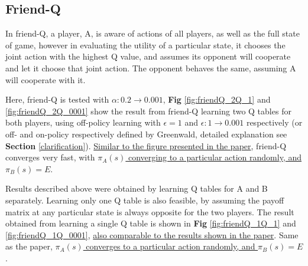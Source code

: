 \documentclass[10pt]{article}
\begin{document}



\subsection{Friend-Q} \label{friendQ}
In friend-Q\cite{LittmanFriendorFoeQlearningGeneralSum2001, GreenwaldCorrelatedQLearning2003, GreenwaldCorrelatedQLearning2005}, a player, A, is aware of actions of all players, as well as the full state of game, however in evaluating the utility of a particular state, it chooses the joint action with the highest Q value, and assumes its opponent will cooperate and let it choose that joint action. The opponent behaves the same, assuming A will cooperate with it.\par

Here, friend-Q is tested with $\alpha:0.2\rightarrow0.001$, \textbf{Fig} \ref{fig:friendQ_2Q_1} and \ref{fig:friendQ_2Q_0001} show the result from friend-Q learning two Q tables for both players, using off-policy learning with $\epsilon=1$ and $\epsilon:1\rightarrow0.001$ respectively (or off- and on-policy respectively defined by Greenwald\cite{GreenwaldCorrelatedQLearning2005}, detailed explanation see \textbf{Section} \ref{clarification}). \ul{Similar to the figure presented in the paper}\cite{GreenwaldCorrelatedQLearning2003}, friend-Q converges very fast, with \ul{$\pi_A(s)$ converging to a particular action randomly, and $\pi_B(s)=E$}.\par
Results described above were obtained by learning Q tables for A and B separately. Learning only one Q table is also feasible, by assuming the payoff matrix at any particular state is always opposite for the two players. The result obtained from learning a single Q table is shown in \textbf{Fig} \ref{fig:friendQ_1Q_1} and \ref{fig:friendQ_1Q_0001}, \ul{also comparable to the results shown in the paper}\cite{GreenwaldCorrelatedQLearning2003}. Same as the paper, \ul{$\pi_A(s)$ converges to a particular action randomly, and $\pi_B(s)=E$}.
\end{document}
